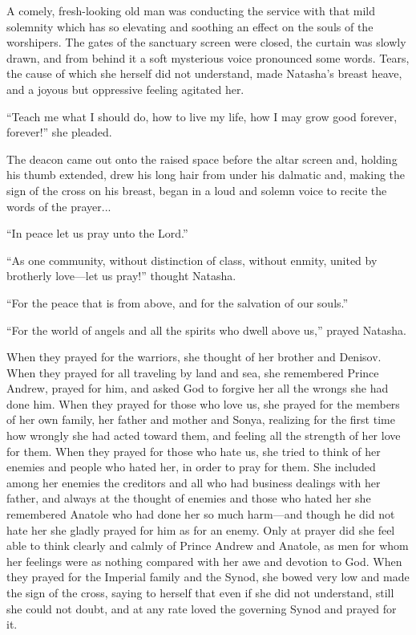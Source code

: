 A comely, fresh-looking old man was conducting the service with
that mild solemnity which has so elevating and soothing an effect
on the souls of the worshipers. The gates of the sanctuary screen
were closed, the curtain was slowly drawn, and from behind it a
soft mysterious voice pronounced some words. Tears, the cause of
which she herself did not understand, made Natasha's breast
heave, and a joyous but oppressive feeling agitated her.

``Teach me what I should do, how to live my life, how I may grow
good forever, forever!'' she pleaded.

The deacon came out onto the raised space before the altar screen
and, holding his thumb extended, drew his long hair from under
his dalmatic and, making the sign of the cross on his breast,
began in a loud and solemn voice to recite the words of the
prayer...

``In peace let us pray unto the Lord.''

``As one community, without distinction of class, without enmity,
united by brotherly love---let us pray!'' thought Natasha.

``For the peace that is from above, and for the salvation of our
souls.''

``For the world of angels and all the spirits who dwell above
us,'' prayed Natasha.

When they prayed for the warriors, she thought of her brother and
Denisov. When they prayed for all traveling by land and sea, she
remembered Prince Andrew, prayed for him, and asked God to
forgive her all the wrongs she had done him. When they prayed for
those who love us, she prayed for the members of her own family,
her father and mother and Sonya, realizing for the first time how
wrongly she had acted toward them, and feeling all the strength
of her love for them. When they prayed for those who hate us, she
tried to think of her enemies and people who hated her, in order
to pray for them. She included among her enemies the creditors
and all who had business dealings with her father, and always at
the thought of enemies and those who hated her she remembered
Anatole who had done her so much harm---and though he did not
hate her she gladly prayed for him as for an enemy. Only at
prayer did she feel able to think clearly and calmly of Prince
Andrew and Anatole, as men for whom her feelings were as nothing
compared with her awe and devotion to God. When they prayed for
the Imperial family and the Synod, she bowed very low and made
the sign of the cross, saying to herself that even if she did not
understand, still she could not doubt, and at any rate loved the
governing Synod and prayed for it.

